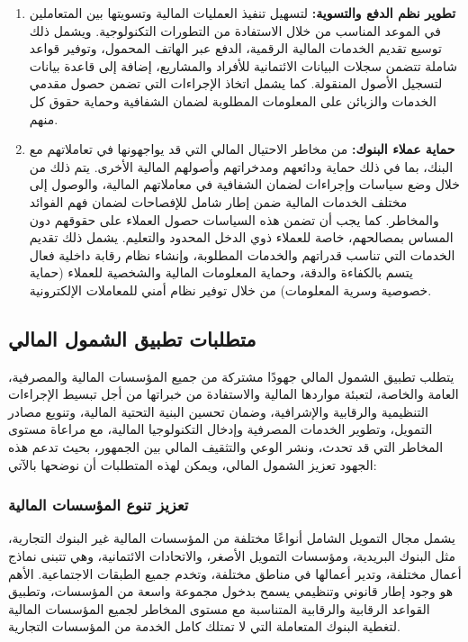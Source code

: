 \documentclass[10pt,a4paper]{report}
\begin{document}
\begin{doublespacing}
\begin{enumerate}
	\item \textbf{تطوير نظم الدفع والتسوية:} 
	لتسهيل تنفيذ العمليات المالية وتسويتها بين المتعاملين في الموعد المناسب من خلال الاستفادة من التطورات التكنولوجية. ويشمل ذلك توسيع تقديم الخدمات المالية الرقمية، الدفع عبر الهاتف المحمول، وتوفير قواعد شاملة تتضمن سجلات البيانات الائتمانية للأفراد والمشاريع، إضافة إلى قاعدة بيانات لتسجيل الأصول المنقولة. كما يشمل اتخاذ الإجراءات التي تضمن حصول مقدمي الخدمات والزبائن على المعلومات المطلوبة لضمان الشفافية وحماية حقوق كل منهم.
	
	\item \textbf{حماية عملاء البنوك:} 
	من مخاطر الاحتيال المالي التي قد يواجهونها في تعاملاتهم مع البنك، بما في ذلك حماية ودائعهم ومدخراتهم وأصولهم المالية الأخرى. يتم ذلك من خلال وضع سياسات وإجراءات لضمان الشفافية في معاملاتهم المالية، والوصول إلى مختلف الخدمات المالية ضمن إطار شامل للإفصاحات لضمان فهم الفوائد والمخاطر. كما يجب أن تضمن هذه السياسات حصول العملاء على حقوقهم دون المساس بمصالحهم، خاصة للعملاء ذوي الدخل المحدود والتعليم. يشمل ذلك تقديم الخدمات التي تناسب قدراتهم والخدمات المطلوبة، وإنشاء نظام رقابة داخلية فعال يتسم بالكفاءة والدقة، وحماية المعلومات المالية والشخصية للعملاء (حماية خصوصية وسرية المعلومات) من خلال توفير نظام أمني للمعاملات الإلكترونية.
\end{enumerate}
\subsection{متطلبات تطبيق الشمول المالي}
يتطلب تطبيق الشمول المالي جهودًا مشتركة من جميع المؤسسات المالية والمصرفية، العامة والخاصة، لتعبئة مواردها المالية والاستفادة من خبراتها من أجل تبسيط الإجراءات التنظيمية والرقابية والإشرافية، وضمان تحسين البنية التحتية المالية، وتنويع مصادر التمويل، وتطوير الخدمات المصرفية وإدخال التكنولوجيا المالية، مع مراعاة مستوى المخاطر التي قد تحدث، ونشر الوعي والتثقيف المالي بين الجمهور، بحيث تدعم هذه الجهود تعزيز الشمول المالي، ويمكن لهذه المتطلبات أن نوضحها بالآتي:
\subsubsection{تعزيز تنوع المؤسسات المالية}
يشمل مجال التمويل الشامل أنواعًا مختلفة من المؤسسات المالية غير البنوك التجارية، مثل البنوك البريدية، ومؤسسات التمويل الأصغر، والاتحادات الائتمانية، وهي تتبنى نماذج أعمال مختلفة، وتدير أعمالها في مناطق مختلفة، وتخدم جميع الطبقات الاجتماعية. الأهم هو وجود إطار قانوني وتنظيمي يسمح بدخول مجموعة واسعة من المؤسسات، وتطبيق القواعد الرقابية والرقابية المتناسبة مع مستوى المخاطر لجميع المؤسسات المالية لتغطية البنوك المتعاملة التي لا تمتلك كامل الخدمة من المؤسسات التجارية. 


\end{doublespacing}
\end{document}
